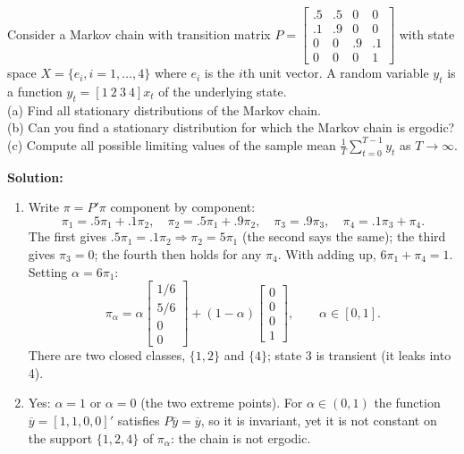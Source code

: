 \documentclass[12pt, letterpaper]{article}
\newcommand{\yb}{\overline{y}}
\begin{document}
\begin{tcolorbox}[evenbox,title={Exercise 2.14 \quad A Reducible Four-State Chain}]
\begin{tcolorbox}[questionbox]
Consider a Markov chain with transition matrix
$P=\begin{bmatrix}.5&.5&0&0\\.1&.9&0&0\\0&0&.9&.1\\0&0&0&1\end{bmatrix}$ with state space
$X=\{e_i,i=1,\dots,4\}$ where $e_i$ is the $i$th unit vector. A random variable $y_t$ is a function
$y_t=[1\ 2\ 3\ 4]x_t$ of the underlying state.\\[3pt]
(a) Find all stationary distributions of the Markov chain.\\
(b) Can you find a stationary distribution for which the Markov chain is ergodic?\\
(c) Compute all possible limiting values of the sample mean $\frac1T\sum_{t=0}^{T-1}y_t$ as
$T\to\infty$.
\end{tcolorbox}

\textbf{Solution:}

\begin{enumerate}
\item Write $\pi=P'\pi$ component by component:
\[
\pi_1=.5\pi_1+.1\pi_2,\quad \pi_2=.5\pi_1+.9\pi_2,\quad \pi_3=.9\pi_3,\quad \pi_4=.1\pi_3+\pi_4 .
\]
The first gives $.5\pi_1=.1\pi_2\Rightarrow\pi_2=5\pi_1$ (the second says the same); the third gives
$\pi_3=0$; the fourth then holds for any $\pi_4$. With adding up, $6\pi_1+\pi_4=1$. Setting
$\alpha=6\pi_1$:
\[
\boxed{\pi_\alpha=\alpha\begin{bmatrix}1/6\\5/6\\0\\0\end{bmatrix}+(1-\alpha)\begin{bmatrix}0\\0\\0\\1\end{bmatrix},\qquad \alpha\in[0,1].}
\]
There are two closed classes, $\{1,2\}$ and $\{4\}$; state 3 is transient (it leaks into 4).

\item Yes: $\alpha=1$ or $\alpha=0$ (the two extreme points). For $\alpha\in(0,1)$ the function
$\yb=[1,1,0,0]'$ satisfies $P\yb=\yb$, so it is invariant, yet it is not constant on the support
$\{1,2,4\}$ of $\pi_\alpha$: the chain is not ergodic.


\end{enumerate}
\end{tcolorbox}
\end{document}
